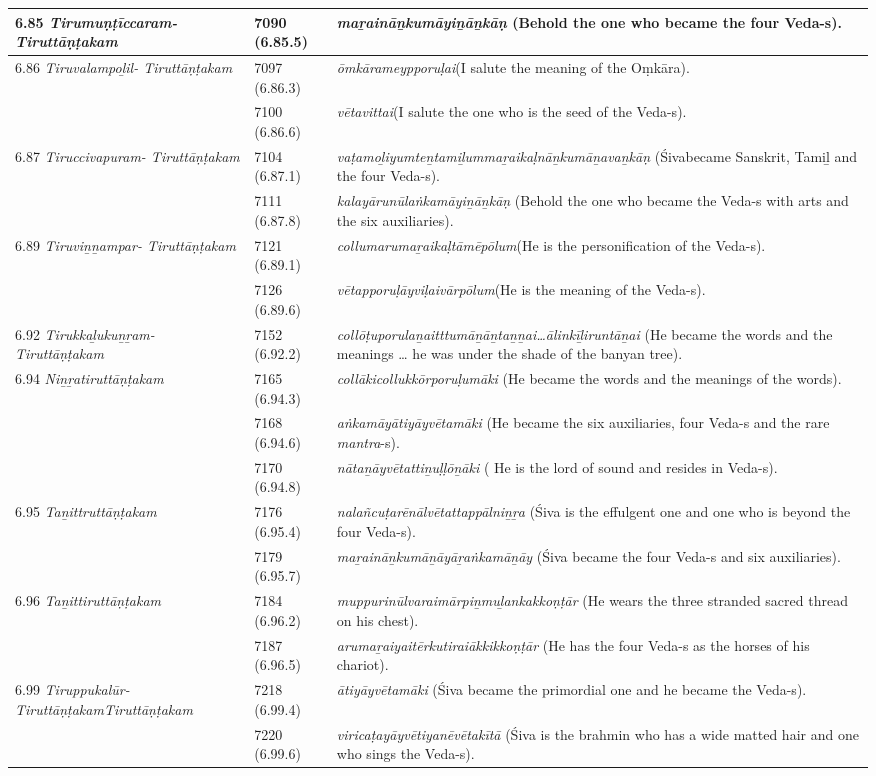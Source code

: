 \begin{longtable}{|m{2.7cm}|m{2.7cm}|>{\raggedright}m{3.1cm}|}
\hline
6.85 \textit{Tirumuṇṭīccaram- Tiruttāṇṭakam} & 7090 (6.85.5) & \textit{maṟaināṉkumāyiṉāṉ\-kāṇ} (Behold the one who became the four Veda-s). \tabularnewline
\hline
6.86 \textit{Tiruvalampoḻil- Tiruttāṇṭakam} & 7097 (6.86.3) & \textit{ōmkārameypporuḷai}\break  (I salute the meaning of the Oṃkāra\index{Omkara@Oṃkāra}). \tabularnewline
\hline
 & 7100 (6.86.6) & \textit{vētavittai}(I salute the one who is the seed of the Veda-s). \tabularnewline
\hline
6.87 \textit{Tiruccivapuram- Tiruttāṇṭakam} & 7104 (6.87.1) & \textit{vaṭamoḻiyumteṉtami\-ḻummaṟaikaḷnāṉku\-māṉavaṉkāṇ} (Śivabecame Sanskrit, Tamiḻ and the four Veda-s). \tabularnewline
\hline
 & 7111 (6.87.8) & \textit{kalayārunūlaṅkamāyi\-ṉāṉkāṇ} (Behold the one who became the Veda-s with arts and the six auxiliaries). \tabularnewline
\hline
6.89 \textit{Tiruviṉṉampar- Tiruttāṇṭakam} & 7121 (6.89.1) & \textit{collumarumaṟaikaḷ\-tāmēpōlum}(He is the personification of the Veda-s). \tabularnewline
\hline
 & 7126 (6.89.6) & \textit{vētapporuḷāyviḷaivār\-pōlum}(He is the meaning of the Veda-s). \tabularnewline
\hline
6.92 \textit{Tirukkaḻukuṉṟam- Tiruttāṇṭakam} & 7152 (6.92.2) & \textit{collōṭuporulaṉaitttu\-māṉāṉtaṉṉai…ālinkīḻi\-runtāṉai} (He became the words and the meanings … he was under the shade of the banyan tree). \tabularnewline
\hline
6.94 \textit{Niṉṟatiruttāṇṭakam} & 7165 (6.94.3) & \textit{collākicollukkōrporu\-ḷumāki} (He became the words and the meanings of the words). \tabularnewline
\hline
 & 7168 (6.94.6) & \textit{aṅkamāyātiyāyvēta\-māki} (He became the six auxiliaries, four Veda-s and the rare \textit{mantra}-s). \tabularnewline
\hline
 & 7170 (6.94.8) & \textit{nātaṉāyvētattiṉuḷḷōṉāki }( He is the lord of sound and resides in Veda-s). \tabularnewline
\hline
6.95 \textit{Taṉittruttāṇṭakam} & 7176 (6.95.4) & \textit{nalañcuṭarēnālvētatta\-ppālniṉṟa} (Śiva is the effulgent one and one who is beyond the four Veda-s). \tabularnewline
\hline
 & 7179 (6.95.7) & \textit{maṟaināṉkumāṉāyā\-ṟaṅkamāṉāy} (Śiva\index{Siva@Śiva} became the four Veda-s and six auxiliaries). \tabularnewline
\hline
6.96 \textit{Taṉittiruttāṇ\-ṭakam} & 7184 (6.96.2) & \textit{muppurinūlvaraimār\-piṉmuḻankakkoṇṭār} (He wears the three stranded sacred thread\index{sacred thread} on his chest). \tabularnewline
\hline
 & 7187 (6.96.5) & \textit{arumaṟaiyaitērkuti\-raiākkikkoṇṭār} (He has the four Veda-s as the horses of his chariot). \tabularnewline
\hline
6.99 \textit{Tiruppukalūr- Tiruttāṇṭakam\-Tiruttāṇṭakam} & 7218 (6.99.4) & \textit{ātiyāyvētamāki} (Śiva became the primordial one and he became the Veda-s). \tabularnewline
\hline
 & 7220 (6.99.6) & \textit{viricaṭayāyvētiyanē\-vētakītā} (Śiva is the brahmin who has a wide matted hair and one who sings the Veda-s). \tabularnewline
\hline
\end{longtable}

